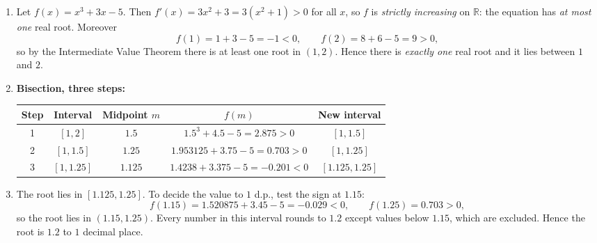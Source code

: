 \documentclass[11pt]{article}
\begin{document}
\begin{corrige}
\begin{enumerate}
\item Let $f(x)=x^{3}+3x-5$. Then $f'(x)=3x^{2}+3=3(x^{2}+1)>0$ for all $x$, so $f$ is \emph{strictly increasing} on $\mathbb{R}$: the equation has \emph{at most one} real root. Moreover
\[
f(1)=1+3-5=-1<0,\qquad f(2)=8+6-5=9>0,
\]
so by the Intermediate Value Theorem there is at least one root in $(1,2)$. Hence there is \emph{exactly one} real root and it lies between $1$ and $2$.
\item \textbf{Bisection, three steps:}
\begin{center}
\begin{tabular}{|c|c|c|c|c|}
\hline
\rowcolor{popblueL} Step & Interval & Midpoint $m$ & $f(m)$ & New interval \\
\hline
1 & $[1,2]$ & $1.5$ & $1.5^{3}+4.5-5=2.875>0$ & $[1,1.5]$ \\
\hline
2 & $[1,1.5]$ & $1.25$ & $1.953125+3.75-5=0.703>0$ & $[1,1.25]$ \\
\hline
3 & $[1,1.25]$ & $1.125$ & $1.4238+3.375-5=-0.201<0$ & $[1.125,1.25]$ \\
\hline
\end{tabular}
\end{center}
\item The root lies in $[1.125,1.25]$. To decide the value to $1$ d.p., test the sign at $1.15$:
\[
f(1.15)=1.520875+3.45-5=-0.029<0,\qquad f(1.25)=0.703>0,
\]
so the root lies in $(1.15,1.25)$. Every number in this interval rounds to $1.2$ except values below $1.15$, which are excluded. Hence the root is $\boxed{1.2}$ to $1$ decimal place.
\end{enumerate}
\end{corrige}
\end{document}
